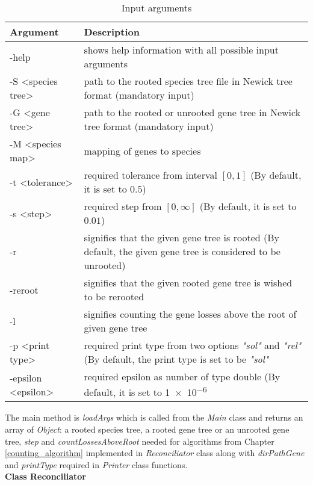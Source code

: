 \begin{table}[ht!]
\caption{Input arguments}
\centering
  \begin{tabular}{| p{} | p{} |}
  \hline
    \textbf{Argument}  & \textbf{Description}\\
    \hline
    -help & shows help information with all possible input arguments \\
    \hline
    -S <species tree> & path to the rooted species tree file in Newick tree format (mandatory input)\\
    \hline
    -G <gene tree> & path to the rooted or unrooted gene tree in Newick tree format (mandatory input)\\
    \hline
    -M <species map> & mapping of genes to species\\
    \hline
    -t <tolerance> & required tolerance from interval $[ 0, 1 ]$ (By default, it is set to $0.5$) \\
    \hline
    -s <step> & required step from $[0, \infty]$ (By default, it is set to $0.01$)\\
    \hline
    -r & signifies that the given gene tree is rooted (By default, the given gene tree is considered to be unrooted)\\
    \hline
    -reroot & signifies that the given rooted gene tree is wished to be rerooted\\
    \hline
    -l & signifies counting the gene losses above the root of given gene tree\\
    \hline
    -p <print type> & required print type from two options \emph{"sol"} and \emph{"rel"} (By default, the print type is set to be \emph{"sol"}\\
    \hline
    -epsilon <epsilon> & required epsilon as number of type double (By default, it is set to \num{1e-6}\\
    \hline
  \end{tabular}
  \label{arguments}
\end{table}

The main method is \emph{loadArgs} which is called from the \emph{Main} class and returns an array of \emph{Object}: a rooted species tree, a rooted gene tree or an unrooted gene tree, \emph{step} and \emph{countLossesAboveRoot} needed for algorithms from Chapter \ref{counting_algorithm} implemented in \emph{Reconciliator} class along with \emph{dirPathGene} and \emph{printType} required in \emph{Printer} class functions.\\
\textbf{Class Reconciliator}

